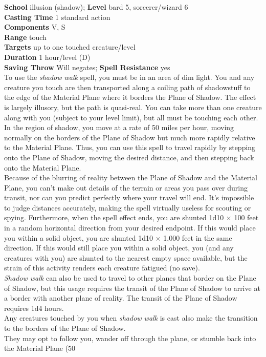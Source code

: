 \textbf{School} illusion (shadow); \textbf{Level} bard 5, sorcerer/wizard 6\\
\textbf{Casting Time} 1 standard action\\
\textbf{Components} V, S\\
\textbf{Range} touch\\
\textbf{Targets} up to one touched creature/level\\
\textbf{Duration} 1 hour/level (D)\\
\textbf{Saving Throw }Will negates; \textbf{Spell Resistance} yes\\
To use the \textit{shadow walk }spell, you must be in an area of dim light. You and any creature you touch are then transported along a coiling path of shadowstuff to the edge of the Material Plane where it borders the Plane of Shadow. The effect is largely illusory, but the path is quasi-real. You can take more than one creature along with you (subject to your level limit), but all must be touching each other.\\
In the region of shadow, you move at a rate of 50 miles per hour, moving normally on the borders of the Plane of Shadow but much more rapidly relative to the Material Plane. Thus, you can use this spell to travel rapidly by stepping onto the Plane of Shadow, moving the desired distance, and then stepping back onto the Material Plane.\\
Because of the blurring of reality between the Plane of Shadow and the Material Plane, you can't make out details of the terrain or areas you pass over during transit, nor can you predict perfectly where your travel will end. It's impossible to judge distances accurately, making the spell virtually useless for scouting or spying. Furthermore, when the spell effect ends, you are shunted 1d10 × 100 feet in a random horizontal direction from your desired endpoint. If this would place you within a solid object, you are shunted 1d10 × 1,000 feet in the same direction. If this would still place you within a solid object, you (and any creatures with you) are shunted to the nearest empty space available, but the strain of this activity renders each creature fatigued (no save).\\
\textit{Shadow walk }can also be used to travel to other planes that border on the Plane of Shadow, but this usage requires the transit of the Plane of Shadow to arrive at a border with another plane of reality. The transit of the Plane of Shadow requires 1d4 hours.\\
Any creatures touched by you when \textit{shadow walk }is cast also make the transition to the borders of the Plane of Shadow.\\
They may opt to follow you, wander off through the plane, or stumble back into the Material Plane (50%
